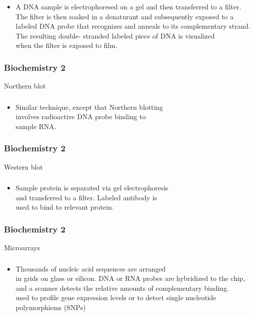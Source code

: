\documentclass[11pt]{beamer}
\begin{document}
\begin{frame}
 \frametitle{}
\begin{itemize}
\item A DNA sample is electrophoresed on a gel and then transferred to a filter. The filter is then soaked in a denaturant and subsequently exposed to a labeled DNA probe that recognizes and anneals to its complementary strand. The resulting double- stranded labeled piece of DNA is visualized \\ when the filter is exposed to film.
\end{itemize}
\end{frame}

\begin{frame}
 \frametitle{Biochemistry 2}
Northern blot
\end{frame}

\begin{frame}
 \frametitle{}
\begin{itemize}
\item Similar technique, except that Northern blotting \\ involves radioactive DNA probe binding to \\ sample RNA.
\end{itemize}
\end{frame}

\begin{frame}
 \frametitle{Biochemistry 2}
Western blot
\end{frame}

\begin{frame}
 \frametitle{}
\begin{itemize}
\item Sample protein is separated via gel electrophoresis \\ and transferred to a filter. Labeled antibody is \\ used to bind to relevant protein.
\end{itemize}
\end{frame}

\begin{frame}
 \frametitle{Biochemistry 2}
Microarrays
\end{frame}

\begin{frame}
 \frametitle{}
\begin{itemize}
\item Thousands of nucleic acid sequences are arranged \\ in grids on glass or silicon. DNA or RNA probes are hybridized to the chip, and a scanner detects the relative amounts of complementary binding. \\ used to profile gene expression levels or to detect single nucleotide polymorphisms (SNPs)
\end{itemize}
\end{frame}
\end{document}

